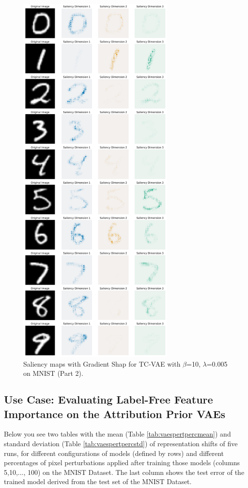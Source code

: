 \begin{figure}[h]
\centering
    \includegraphics[width=0.7\textwidth]{images/vae/tc_vae_10_sms_mnist_lambda_0_005_2.PNG}
\caption{Saliency maps with Gradient Shap for TC-VAE with  $\beta$=10, $\lambda$=0.005 on MNIST (Part 2).}\label{fig:tcvae10smsmnistlambda00052}
\end{figure}


\newpage
\clearpage
\subsection{Use Case: Evaluating Label-Free Feature Importance on the Attribution Prior VAEs}
Below you see two tables with the mean (Table \ref{tab:vaespertpercmean}) and standard deviation (Table \ref{tab:vaespertpercstd}) of representation shifts of five runs, for different configurations of models (defined by rows) and different percentages of pixel perturbations applied after training those models (columns 5,10,..., 100) on the MNIST Dataset. The last column shows the test error of the trained model derived from the test set of the MNIST Dataset.

